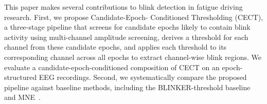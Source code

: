 
This paper makes several contributions to blink detection in fatigue driving research. First, we propose  Candidate-Epoch-
Conditioned Thresholding (CECT), a three-stage pipeline that screens for candidate epochs likely to contain blink activity using multi-channel amplitude screening, derives a threshold for each channel from these candidate epochs, and applies each threshold to its corresponding channel across all epochs to extract channel-wise blink regions.
We evaluate a candidate-epoch-conditioned composition of CECT on an epoch-structured EEG recordings.
Second, we systematically compare the proposed pipeline against baseline methods, including the BLINKER-threshold baseline~\citep{kleifges2017blinker} and MNE~\citep{GramfortEtAl2013a}.

